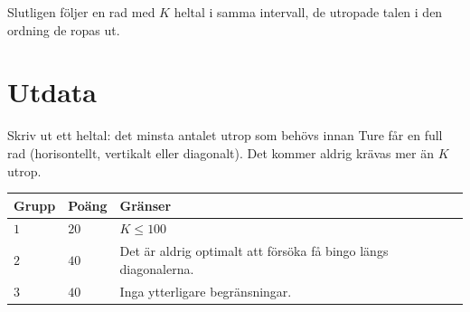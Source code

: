 Slutligen följer en rad med $K$ heltal i samma intervall, de utropade talen i den ordning de ropas ut.

\section*{Utdata}
Skriv ut ett heltal: det minsta antalet utrop som behövs innan Ture får en full rad (horisontellt,
vertikalt eller diagonalt). Det kommer aldrig krävas mer än $K$ utrop.

\noindent
\begin{tabular}{| l | l | p{12cm} |}
  \hline
  \textbf{Grupp} & \textbf{Poäng} & \textbf{Gränser} \\ \hline
  $1$    & $20$       & $K \leq 100$ \\ \hline
  $2$    & $40$       & Det är aldrig optimalt att försöka få bingo längs diagonalerna. \\ \hline
  $3$    & $40$       & Inga ytterligare begränsningar. \\ \hline
\end{tabular}


